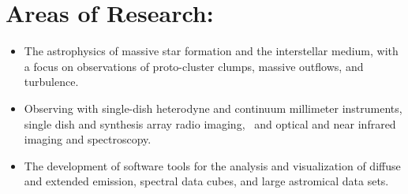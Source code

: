 \documentclass{article}
\begin{document}
\section*{Areas of Research: }
\begin{itemize}
    \item The astrophysics of massive star formation and the interstellar
        medium, with a focus on observations of proto-cluster
        clumps, massive outflows, and turbulence. 
    \item Observing with single-dish heterodyne and continuum millimeter
        instruments, single dish and synthesis array radio imaging,  and
        optical and near infrared imaging and spectroscopy. 
    \item The development of software tools for the analysis and visualization
        of diffuse and extended emission, spectral data cubes, and large
        astromical data sets.
\end{itemize}
\end{document}
